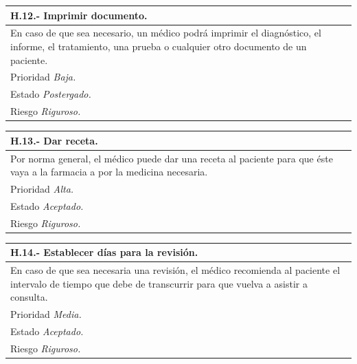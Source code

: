 \documentclass[a4paper,oneside,11pt]{book}
\begin{document}
\begin{center}
\begin{tabulary}{15cm}{|L|}
	\hline
		\bf{H.12.- Imprimir documento.} \\
	\hline
		En caso de que sea necesario, un médico podrá imprimir el diagnóstico, el informe, el tratamiento, una prueba o cualquier otro documento de un paciente. \\
	\hline
		Prioridad \textit{Baja.} \\
	\hline
		Estado \textit{Postergado.} \\
	\hline
		Riesgo \textit{Riguroso.} \\
	\hline
\end{tabulary}
\end{center}

\begin{center}
\begin{tabulary}{15cm}{|L|}
	\hline
		\bf{H.13.- Dar receta.} \\
	\hline
		Por norma general, el médico puede dar una receta al paciente para que éste vaya a la farmacia a por la medicina necesaria. \\
	\hline
		Prioridad \textit{Alta.} \\
	\hline
		Estado \textit{Aceptado.} \\
	\hline
		Riesgo \textit{Riguroso.} \\
	\hline
\end{tabulary}
\end{center}

\begin{center}
\begin{tabulary}{15cm}{|L|}
	\hline
		\bf{H.14.- Establecer días para la revisión.} \\
	\hline
		En caso de que sea necesaria una revisión, el médico recomienda al paciente el intervalo de tiempo que debe de transcurrir para que vuelva a asistir a consulta. \\
	\hline
		Prioridad \textit{Media.} \\
	\hline
		Estado \textit{Aceptado.} \\
	\hline
		Riesgo \textit{Riguroso.} \\
	\hline
\end{tabulary}
\end{center}
\end{document}

